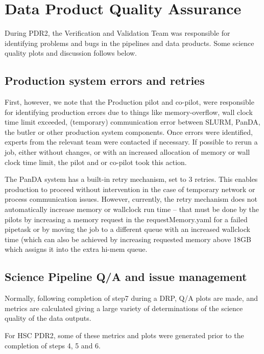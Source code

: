 \section{Data Product Quality Assurance} \label{sec:qa}

During PDR2, the Verification and Validation Team was responsible 
for identifying problems and bugs in the pipelines and data products. 
Some science quality plots and discussion follows below.

\subsection{Production system errors and retries}

First, however, we note that the Production pilot and co-pilot, 
were responsible for identifying production errors due to things 
like memory-overflow, wall clock time limit exceeded, 
(temporary) communication error between SLURM, PanDA, the butler or other 
production system components.  Once errors were
identified, experts from the relevant team were contacted if necessary.
If possible to rerun a job, either without changes, or with an
increased allocation of memory or wall clock time limit, the pilot and
or co-pilot took this action.

The PanDA system has a built-in retry mechanism, set to 3 retries.  This
enables production to proceed without intervention in the case of
temporary network or process communication issues. However,
currently, the retry mechanism does not automatically increase memory
or wallclock run time -- that must be done by the pilots by increasing
a memory request in the requestMemory.yaml for a failed pipetask or
by moving the job to a different queue with an increased wallclock time
(which can also be achieved by increasing requested memory above 18GB which
assigns it into the extra hi-mem queue.


\subsection{Science Pipeline Q/A and issue management}


Normally, following completion of step7 during a DRP, Q/A plots are made,
and metrics are calculated giving a large variety of determinations of
the science quality of the data outputs.

For HSC PDR2, some of these metrics and plots were generated prior to 
the completion of steps 4, 5 and 6.

